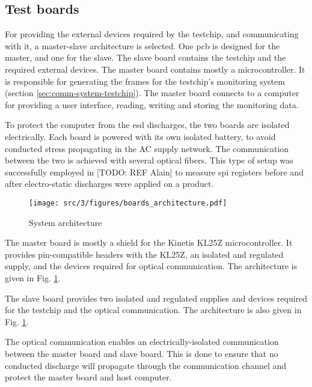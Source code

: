 \subsection{Test boards}

For providing the external devices required by the testchip, and communicating with it, a master-slave architecture is selected.
One \gls{pcb} is designed for the master, and one for the slave.
The slave board contains the testchip and the required external devices.
The master board contains mostly a microcontroller.
It is responsible for generating the frames for the testchip's monitoring system (section \ref{sec:comm-system-testchip}).
The master board connects to a computer for providing a user interface, reading, writing and storing the monitoring data.

To protect the computer from the \gls{esd} discharges, the two boards are isolated electrically.
Each board is powered with its own isolated battery, to avoid conducted stress propagating in the AC supply network.
The communication between the two is achieved with several optical fibers.
This type of setup was successfully employed in [TODO: REF Alain] to measure \gls{spi} registers before and after electro-static discharges were applied on a product.

\begin{figure}[!h]
  \centering
  \texttt{[image: src/3/figures/boards\_architecture.pdf]}
  \caption{System architecture}
  \label{fig:system-board-architecture}
\end{figure}


The master board is mostly a shield for the Kinetis KL25Z microcontroller.
It provides pin-compatible headers with the KL25Z, an isolated and regulated supply, and the devices required for optical communication.
The architecture is given in Fig. \ref{fig:system-board-architecture}.

The slave board provides two isolated and regulated supplies and devices required for the testchip and the optical communication.
The architecture is also given in Fig. \ref{fig:system-board-architecture}.

The optical communication enables an electrically-isolated communication between the master board and slave board.
This is done to ensure that no conducted discharge will propagate through the communication channel and protect the master board and host computer.
